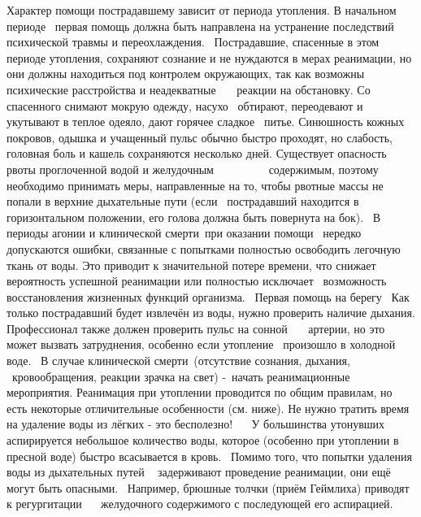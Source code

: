 \documentclass[a4paper, 12pt]{article}
\theoremstyle{definition}
\begin{document}
        Характер помощи пострадавшему зависит от периода утопления.
        В начальном периоде  первая помощь дол­жна быть направлена на устранение последствий психической травмы и переохлаждения.  Постра­давшие, спасенные в этом периоде утопления, со­храняют сознание и не нуждаются в мерах реанимации, но они должны находиться под контролем окружающих, так как возможны психические рас­стройства и неадекватные    реакции на обстановку. Со спасенного снимают мокрую одежду, насухо  обтирают, переодевают и укутывают в теплое оде­яло, дают горячее сладкое  питье. Синюшность кож­ных покровов, одышка и учащенный пульс обыч­но быстро проходят, но слабость, головная боль и кашель сохраняются несколько дней. Существует опасность рвоты проглоченной водой и желудоч­ным          содержимым, поэтому необходимо принимать меры, направленные на то, чтобы рвотные массы не попали в верхние дыхательные пути (если  пост­радавший находится в горизонтальном положении, его голова должна быть повернута на бок).
         В периоды агонии и клинической смерти при оказании помощи  нередко допускаются ошибки, связанные с попытками полностью освободить ле­гочную ткань от воды. Это приводит к значитель­ной потере времени, что снижает вероятность ус­пешной реанимации или полностью исключает  воз­можность восстановления жизненных функций организма.
         Первая помощь на берегу
         Как только пострадавший будет извлечён из воды, нужно проверить наличие дыхания. Профессионал также должен проверить пульс на сонной    артерии, но это может вызвать затруднения, особенно если утопление  произошло в холодной воде.
         В случае клинической смерти (отсутствие сознания, дыхания,  кровообращения, реакции зрачка на свет) - начать реанимационные     мероприятия. Реанимация при утоплении проводится по общим правилам, но есть некоторые отличительные особенности (см. ниже).
        Не нужно тратить время на удаление воды из лёгких
        - это бесполезно!
         
         У большинства утонувших аспирируется небольшое количество воды, которое (особенно при утоплении в пресной воде) быстро всасывается в кровь.
         Помимо того, что попытки удаления воды из дыхательных путей   задерживают проведение реанимации, они ещё могут быть опасными.  Например, брюшные толчки (приём Геймлиха) приводят к регургитации    желудочного содержимого с последующей его аспирацией.
        
\end{document}
